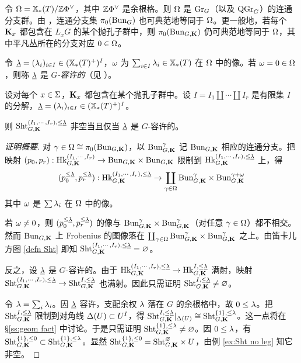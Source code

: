 令 $\Omega=\mathbb{X}_*(T)/\mathbb{Z}\Phi^{\vee}$，其中 $\mathbb{Z}\Phi^{\vee}$ 是余根格。则 $\Omega$ 是 $\textup{Gr}_{G}$（以及 $\mathrm{QGr}_{G}$）的连通分支群。由 \cite[引理 2.2]{Var}，连通分支集 $\pi_{0}(\textup{Bun}_{G})$ 也可典范地等同于 $\Omega$。更一般地，若每个 $\mathbf{K}_{x}$ 都包含在 $L_{x}G$ 的某个抛孔子群中，则 $\pi_{0}(\textup{Bun}_{G,\mathbf{K}})$ 仍可典范地等同于 $\Omega$，其中平凡丛所在的分支对应 $0\in \Omega$。


令 $\underline{\lambda}=(\lambda_{i})_{i\in I}\in (\mathbb{X}_*(T)^{+})^{I}$，$\omega$ 为 $\sum_{i\in I}\lambda_{i}\in \mathbb{X}_*(T)$ 在 $\Omega$ 中的像。若 $\omega=0\in \Omega$，则称 $\underline{\lambda}$ 是 {\em $G$-容许的}（见 \cite[定义 2.14]{Var}）。

\begin{lem} 设对每个 $x\in \Sigma$，$\mathbf{K}_{x}$ 都包含在某个抛孔子群中。设 $I=I_{1}\coprod\cdots\coprod I_{r}$ 是有限集 $I$ 的分解，$\underline{\lambda}=(\lambda_{i})_{i\in I}\in (\mathbb{X}_*(T)^{+})^{I}$。

则 $\textup{Sht}^{(I_{1},\cdots, I_{r}), \le\underline{\lambda}}_{G,\mathbf{K}}$ 非空当且仅当 $\underline{\lambda}$ 是 $G$-容许的。
\end{lem}
\begin{proof}[证明概要]

对 $\gamma\in \Omega\cong \pi_{0}(\textup{Bun}_{G,\mathbf{K}})$，以 $\textup{Bun}_{G, \mathbf{K}}^{\gamma}$ 记 $\textup{Bun}_{G,\mathbf{K}}$ 相应的连通分支。把映射 $(p_{0},p_{r}): \textup{Hk}^{(I_{1},\cdots, I_{r})}_{G,\mathbf{K}}\to \textup{Bun}_{G,\mathbf{K}}\times\textup{Bun}_{G,\mathbf{K}}$ 限制到 $\textup{Hk}^{(I_{1},\cdots, I_{r}), \le\underline{\lambda}}_{G,\mathbf{K}}$ 上，得
\begin{equation*}
(p^{\le\underline{\lambda}}_{0},p^{\le\underline{\lambda}}_{r}):  \textup{Hk}^{(I_{1},\cdots, I_{r}), \le\underline{\lambda}}_{G,\mathbf{K}}\to \coprod_{\gamma\in \Omega} \textup{Bun}_{G,\mathbf{K}}^{\gamma}\times \textup{Bun}^{\gamma+\omega}_{G,\mathbf{K}}
\end{equation*}
其中 $\omega$ 是 $\sum\lambda_{i}$ 在 $\Omega$ 中的像。

若 $\omega\ne0$，则 $(p^{\le\underline{\lambda}}_{0},p^{\le\underline{\lambda}}_{r})$ 的像与 $\textup{Bun}_{G,\mathbf{K}}^{\gamma}\times \textup{Bun}^{\gamma}_{G,\mathbf{K}}$（对任意 $\gamma\in \Omega$）都不相交。然而 $\textup{Bun}_{G,\mathbf{K}}$ 上 Frobenius 的图像落在 $\coprod_{\gamma\in \Omega} \textup{Bun}_{G,\mathbf{K}}^{\gamma}\times \textup{Bun}^{\gamma}_{G,\mathbf{K}}$ 之上。由笛卡儿方图 \eqref{defn Sht} 即知 $\textup{Sht}^{(I_{1},\cdots, I_{r}), \le\underline{\lambda}}_{G,\mathbf{K}}=\varnothing$。

反之，设 $\underline{\lambda}$ 是 $G$-容许的。由于 $\textup{Hk}^{(I_{1},\cdots, I_{r}),\le\underline{\lambda}}_{G, \mathbf{K}}\to \textup{Hk}^{I,\le\underline{\lambda}}_{G,\mathbf{K}}$ 满射，映射 $\textup{Sht}^{(I_{1},\cdots, I_{r}),\le\underline{\lambda}}_{G, \mathbf{K}}\to \textup{Sht}^{I,\le\underline{\lambda}}_{G,\mathbf{K}}$ 也满射。因此只需证明 $\textup{Sht}^{I,\le\underline{\lambda}}_{G,\mathbf{K}}\ne\varnothing$。

令 $\lambda=\sum_{i}\lambda_{i}$。因 $\underline{\lambda}$ 容许，支配余权 $\lambda$ 落在 $G$ 的余根格中，故 $0\le \lambda$。把 $\textup{Sht}^{I,\le\underline{\lambda}}_{G,\mathbf{K}}$ 限制到对角线 $\Delta(U)\subset U^{I}$，得 $\textup{Sht}^{I,\le\underline{\lambda}}_{G,\mathbf{K}}|_{\Delta(U)}\cong \textup{Sht}^{\{1\},\le\lambda}_{G,\mathbf{K}}$。这一点将在 \S\ref{ss:geom fact} 中讨论。于是只需证明 $\textup{Sht}^{\{1\},\le\lambda}_{G,\mathbf{K}}\ne\varnothing$。因 $0\le \lambda$，有 $\textup{Sht}^{\{1\},\le0}_{G,\mathbf{K}}\subset \textup{Sht}^{\{1\},\le\lambda}_{G,\mathbf{K}}$。显然 $\textup{Sht}^{\{1\},\le0}_{G,\mathbf{K}}=\textup{Sht}^{\varnothing}_{G,\mathbf{K}}\times U$，由例 \ref{ex:Sht no leg} 知它非空。
\end{proof}
